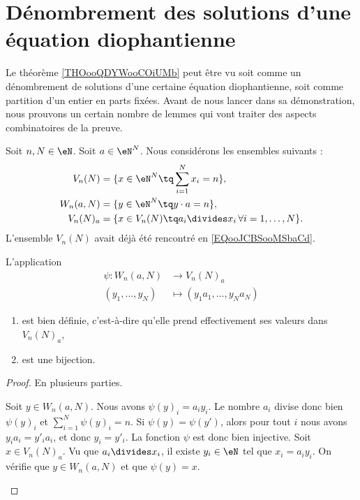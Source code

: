 \section{Dénombrement des solutions d'une équation diophantienne}

Le théorème \ref{THOooQDYWooCOiUMb} peut être vu soit comme un dénombrement de solutions d'une certaine équation diophantienne, soit comme partition d'un entier en parts fixées. Avant de nous lancer dans sa démonstration, nous prouvons un certain nombre de lemmes qui vont traiter des aspects combinatoires de la preuve.

Soit \( n,N\in \eN\). Soit \( a\in \eN^N\). Nous considérons les ensembles suivants :
\begin{subequations}
	\begin{align}
		V_n(N)   & =\{ x\in \eN^N\tq \sum_{i=1}^Nx_i=n \},                       \\
		W_n(a,N) & =\{ y\in \eN^N\tq y\cdot a=n \},                              \\
		V_n(N)_a & =\{ x\in V_n(N)\tq a_i\divides x_i\,\forall i=1,\ldots, N \}.
	\end{align}
\end{subequations}
L'ensemble \( V_n(N)\) avait déjà été rencontré en \eqref{EQooJCBSooMSbaCd}.

\begin{lemma}       \label{LEMooLKCAooCeDnSj}
	L'application
	\begin{equation}
		\begin{aligned}
			\psi\colon W_n(a,N) & \to V_n(N)_a                    \\
			(y_1,\ldots, y_N)   & \mapsto (y_1a_1,\ldots, y_Na_N)
		\end{aligned}
	\end{equation}
	\begin{enumerate}
		\item
		      est bien définie, c'est-à-dire qu'elle prend effectivement ses valeurs dans \( V_n(N)_a\),
		\item
		      est une bijection.
	\end{enumerate}
\end{lemma}

\begin{proof}
	En plusieurs parties.
	\begin{subproof}
		Soit \( y\in W_n(a,N)\). Nous avons \( \psi(y)_i=a_iy_i\). Le nombre \( a_i\) divise donc bien \( \psi(y)_i\) et \( \sum_{i=1}^N\psi(y)_i=n\).
		\spitem[Injective]
		Si \( \psi(y)=\psi(y')\), alors pour tout \( i\) nous avons \( y_ia_i=y'_ia_i\), et donc \( y_i=y'_i\). La fonction \( \psi\) est donc bien injective.
		\spitem[Surjective]
		Soit \( x\in V_n(N)_a\). Vu que \( a_i\divides x_i\), il existe \( y_i\in \eN\) tel que \( x_i=a_iy_i\). On vérifie que \( y\in W_n(a,N)\) et que \( \psi(y)=x\).
	\end{subproof}
\end{proof}


